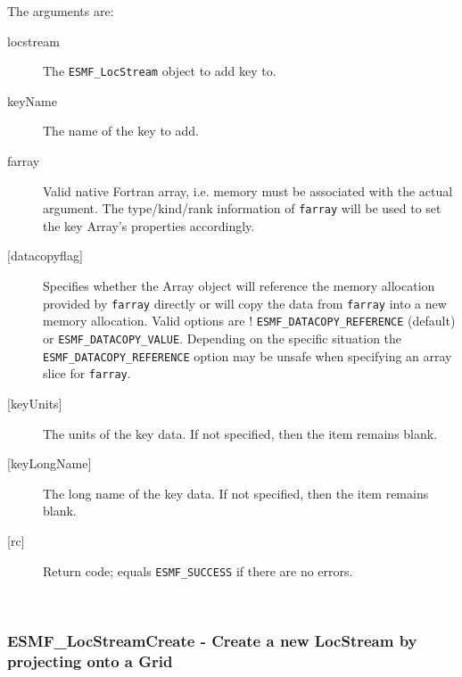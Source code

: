       The arguments are:
      \begin{description}
      \item [locstream]
      The {\tt ESMF\_LocStream} object to add key to.
      \item [keyName]
      The name of the key to add. 
      \item[farray] 
      Valid native Fortran array, i.e. memory must be associated with the 
      actual argument. The type/kind/rank information of {\tt farray} will be 
      used to set the key Array's properties accordingly. 
      \item[{[datacopyflag]}] 
      Specifies whether the Array object will reference the memory allocation 
      provided by {\tt farray} directly or will copy the data from 
      {\tt farray} into a new memory allocation. Valid options are 
  !    {\tt ESMF\_DATACOPY\_REFERENCE} (default) or {\tt ESMF\_DATACOPY\_VALUE}. 
      Depending on the specific situation the {\tt ESMF\_DATACOPY\_REFERENCE} option 
      may be unsafe when specifying an array slice for {\tt farray}. 
      \item [{[keyUnits]}]
      The units of the key data. 
      If not specified, then the item remains blank.  
      \item [{[keyLongName]}]
      The long name of the key data. 
      If not specified, then the item remains blank.  
      \item [{[rc]}]
      Return code; equals {\tt ESMF\_SUCCESS} if there are no errors.
      \end{description} 
 
\mbox{}\hrulefill\ 
 
\subsubsection [ESMF\_LocStreamCreate] {ESMF\_LocStreamCreate - Create a new LocStream by projecting onto a Grid}


